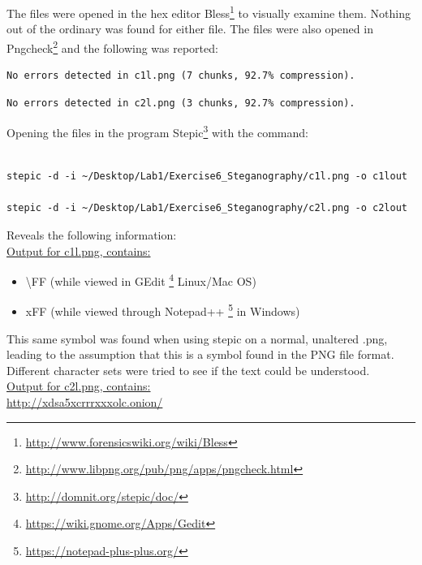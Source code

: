 \documentclass[a4paper,10pt,oneside]{article}
\begin{document}
The files were opened in the hex editor Bless\footnote{\url{http://www.forensicswiki.org/wiki/Bless}} 
to visually examine them. Nothing out of the ordinary was found for either file.
The files were also opened in Pngcheck\footnote{\url{http://www.libpng.org/pub/png/apps/pngcheck.html}}
and the following was reported:


\begin{lstlisting}[caption=c1l.png]
No errors detected in c1l.png (7 chunks, 92.7% compression).
\end{lstlisting}

\begin{lstlisting}[caption=c2l.png]
No errors detected in c2l.png (3 chunks, 92.7% compression).
\end{lstlisting}

Opening the files in the program Stepic\footnote{\url{http://domnit.org/stepic/doc/}}
with the command:

\begin{lstlisting}[caption=stepic command]

stepic -d -i ~/Desktop/Lab1/Exercise6_Steganography/c1l.png -o c1lout

stepic -d -i ~/Desktop/Lab1/Exercise6_Steganography/c2l.png -o c2lout

\end{lstlisting}

Reveals the following information:\\

\underline{Output for c1l.png, contains:}
\begin{itemize}
	\item \textbackslash FF (while viewed in GEdit
	\footnote{\url{https://wiki.gnome.org/Apps/Gedit}} 
	Linux/Mac OS)
	
	\item xFF (while viewed through Notepad++
	\footnote{\url{https://notepad-plus-plus.org/}}
	in Windows)
\end{itemize}

This same symbol was found when using stepic on a normal, unaltered .png, leading to the assumption that this is a symbol found in the PNG file format. Different character sets were tried to see if the text could be understood.\\


\underline{Output for c2l.png, contains:}\\
\newline
\url{http://xdsa5xcrrrxxxolc.onion/}\\
\end{document}

